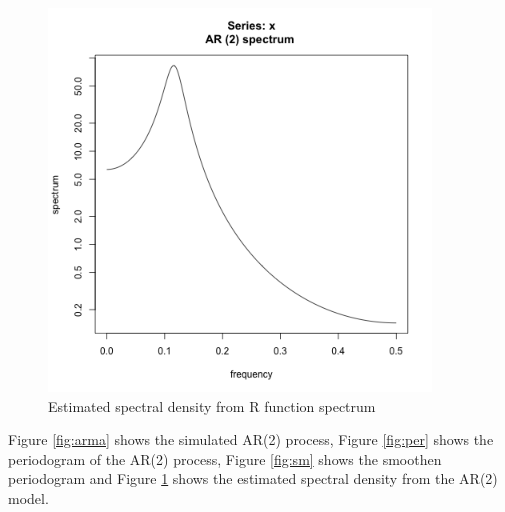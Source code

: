 \documentclass[11pt, oneside]{article}   	%
\begin{document}
\begin{figure}[H] %
   \centering
   \includegraphics[width=4in]{../code/EstimatedSpectralDensity.png} 
   \caption{Estimated spectral density from R function spectrum}
   \label{fig:es}
\end{figure}
\justify
Figure \ref{fig:arma} shows the simulated AR(2) process, Figure \ref{fig:per} shows the periodogram of the AR(2) process, Figure \ref{fig:sm} shows the smoothen periodogram and Figure \ref{fig:es} shows the
estimated spectral density from the AR(2) model.


\clearpage
\end{document}
